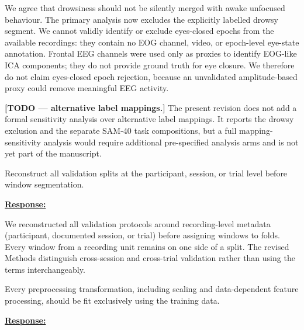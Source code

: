 \documentclass{article}
\begin{document}
We agree that drowsiness should not be silently merged with awake unfocused
behaviour. The primary analysis now excludes the explicitly labelled drowsy
segment. We cannot validly identify or exclude eyes-closed epochs
from the available recordings: they contain no EOG channel, video, or
epoch-level eye-state annotation. Frontal EEG channels were used only as proxies
to identify EOG-like ICA components; they do not provide ground truth for eye
closure. We therefore do not claim eyes-closed epoch rejection, because an
unvalidated amplitude-based proxy could remove meaningful EEG activity.

\textbf{[TODO --- alternative label mappings.]}
The present revision does not add a formal sensitivity analysis over alternative
label mappings. It reports the drowsy exclusion and the separate SAM-40 task
compositions, but a full mapping-sensitivity analysis would require additional
pre-specified analysis arms and is not yet part of the manuscript.

\vspace{0.3cm}


\begin{cmt}{}{}

Reconstruct all validation splits at the participant, session, or trial level
before window segmentation.

\end{cmt}
\vspace{0.1cm}
\noindent
\underline{\textbf{Response:}}
\vspace{0.2cm}

We reconstructed all validation protocols around recording-level metadata
(participant, documented session, or trial) before assigning windows to folds.
Every window from a recording unit remains on one side of a split. The revised
Methods distinguish cross-session and cross-trial validation rather than using
the terms interchangeably.

\vspace{0.3cm}


\begin{cmt}{}{}

Every preprocessing transformation, including scaling and data-dependent feature
processing, should be fit exclusively using the training data.

\end{cmt}
\vspace{0.1cm}
\noindent
\underline{\textbf{Response:}}
\vspace{0.2cm}
\end{document}
